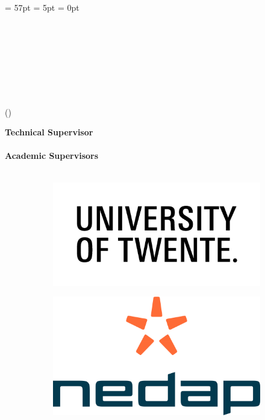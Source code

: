 \begin{titlepage}
\headheight = 57pt
\footskip = 5pt
\headsep = 0pt


{\begin{Large}
\university\\
\end{Large} }
\school\\
\department\\

\vspace*{5 cm}



\begin{Large}
\textbf{\doctitle}\\
\end{Large}
\docsubtitle\\
\me \quad (\studentcode)\\

\begin{flushright}
\textbf{Technical Supervisor}\\ \supervisor\\
\textbf{Academic Supervisors}\\\cosupervisor\\
\cocosupervisor
\end{flushright}

\vspace*{3cm}
\begin{figure}[h]
\centering
\begin{subfigure}{.5\textwidth}
  \centering
  \includegraphics[width=.5\linewidth]{images/utwente.png}
\end{subfigure}%
\begin{subfigure}{.5\textwidth}
  \centering
  \includegraphics[width=.4\linewidth]{images/nedap.png}
\end{subfigure}
\end{figure}





\vfill
\end{titlepage}